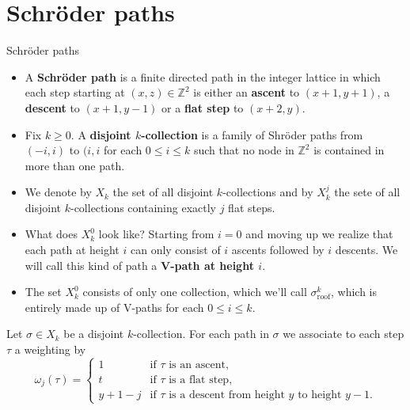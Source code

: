 \documentclass[12pt]{beamer}
\begin{document}
\section{Schröder paths}

\begin{frame}[allowframebreaks]{Schröder paths}

\begin{definition}
\begin{itemize}
\item A \textbf{Schröder path} is a finite directed path in the integer lattice in which each step starting at $(x,z) \in \mathbb{Z}^2$ is either an \textbf{ascent} to $(x+1,y+1)$, a \textbf{descent} to $(x+1,y-1)$ or a \textbf{flat step} to $(x+2,y)$.
\item Fix $k\geq0$. A \textbf{disjoint $k$-collection} is a family of Shröder paths from $(-i,i)$ to $(i,i$ for each $0\leq i \leq k$ such that no node in $\mathbb{Z}^2$ is contained in more than one path.
\item We denote by $X_k$ the set of all disjoint $k$-collections and by $X_k^j$ the sete of all disjoint $k$-collections containing exactly $j$ flat steps.
\end{itemize}
\end{definition}

\framebreak

\begin{itemize}
\item What does $X_k^0$ look like? Starting from $i = 0$ and moving up we realize that each path at height $i$ can only consist of $i$ ascents followed by $i$ descents. We will call this kind of path a \textbf{V-path at height $i$}. 
\item The set $X_k^0$ consists of only one collection, which we'll call $\sigma_{\text{roof}}^k$, which is entirely made up of V-paths for each $0\leq i \leq k$.
\end{itemize}

\framebreak

Let $\sigma \in X_k$ be a disjoint $k$-collection. For each path in $\sigma$ we associate to each step $\tau$ a weighting by
\begin{equation*}
\omega_j(\tau) = \begin{cases}
1 &\text{if $\tau$ is an ascent}, \\
t &\text{if $\tau$ is a flat step}, \\
y+1-j &\text{if $\tau$ is a descent from height $y$ to height $y-1$}.
\end{cases}
\end{equation*}


\end{frame}
\end{document}
